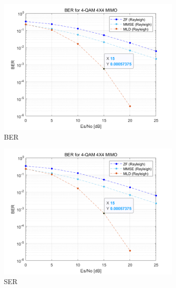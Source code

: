 \documentclass{article}
\begin{document}
\begin{figure}[H]
	\centering
	\begin{subfigure}{0.5\textwidth}
		\centerline{\includegraphics[width=1\textwidth]{c_Es_BER.png}}
		\caption{BER}
	\end{subfigure}%
	\begin{subfigure}{0.5\textwidth}
		\centerline{\includegraphics[width=1\textwidth]{c_Es_BER.png}}
		\caption{SER}
	\end{subfigure}\\%
	\begin{subfigure}{0.5\textwidth}

\end{subfigure}
\end{figure}
\end{document}
